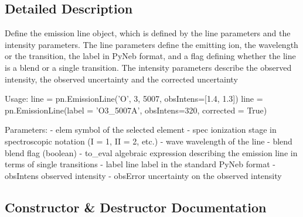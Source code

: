 \subsection{Detailed Description}
\begin{DoxyVerb}Define the emission line object, which is defined by the line parameters and the intensity 
    parameters.
The line parameters define the emitting ion, the wavelength or the transition, the label 
    in PyNeb format, and a flag defining whether the line is a blend or a single transition. 
The intensity parameters describe the observed intensity, the observed uncertainty and 
    the corrected uncertainty
    
Usage:
    line = pn.EmissionLine('O', 3, 5007, obsIntens=[1.4, 1.3])
    line = pn.EmissionLine(label = 'O3_5007A', obsIntens=320, corrected = True)

Parameters:
    - elem        symbol of the selected element
    - spec        ionization stage in spectroscopic notation (I = 1, II = 2, etc.)
    - wave        wavelength of the line
    - blend       blend flag (boolean)
    - to_eval     algebraic expression describing the emission line in terms of single transitions
    - label       line label in the standard PyNeb format
    - obsIntens   observed intensity
    - obsError    uncertainty on the observed intensity\end{DoxyVerb}
 

\subsection{Constructor \& Destructor Documentation}
\hypertarget{classpyneb_1_1core_1_1pynebcore_1_1_emission_line_ac775ee34451fdfa742b318538164070e}{}
